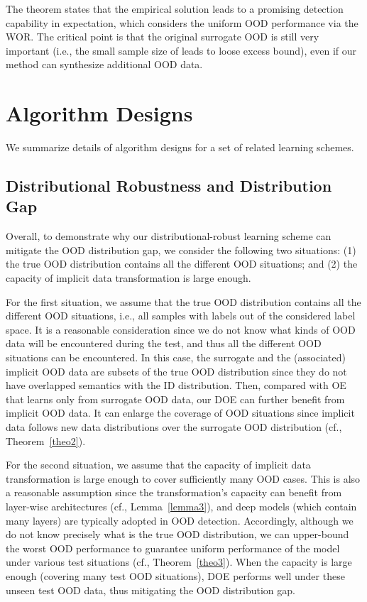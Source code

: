 \documentclass{article} \usepackage{iclr2022_conference,times}
\begin{document}
The theorem states that the empirical solution leads to a promising detection capability in expectation, which considers the uniform OOD performance via the WOR. The critical point is that the original surrogate OOD is still very important (i.e., the small sample size of  leads to loose excess bound), even if our method can synthesize additional OOD data. 

\clearpage
\section{Algorithm Designs}
\label{app: alg}

We summarize details of algorithm designs for a set of related learning schemes. 

\subsection{Distributional Robustness and Distribution Gap}


{
Overall, to demonstrate why our distributional-robust learning scheme can mitigate the OOD distribution gap, we consider the following two situations: (1) the true OOD distribution contains all the different OOD situations; and (2) the capacity of implicit data transformation is large enough.
}

{
For the first situation, we assume that the true OOD distribution contains all the different OOD situations, i.e., all samples with labels out of the considered label space. It is a reasonable consideration since we do not know what kinds of OOD data will be encountered during the test, and thus all the different OOD situations can be encountered. In this case, the surrogate and the (associated) implicit OOD data are subsets of the true OOD distribution since they do not have overlapped semantics with the ID distribution. Then, compared with OE that learns only from surrogate OOD data, our DOE can further benefit from implicit OOD data. It can enlarge the coverage of OOD situations since implicit data follows new data distributions over the surrogate OOD distribution (cf., Theorem~\ref{theo2}).}

{For the second situation, we assume that the capacity of implicit data transformation is large enough to cover sufficiently many OOD cases. This is also a reasonable assumption since the transformation's capacity can benefit from layer-wise architectures (cf., Lemma~\ref{lemma3}), and deep models (which contain many layers) are typically adopted in OOD detection. Accordingly, although we do not know precisely what is the true OOD distribution, we can upper-bound the worst OOD performance to guarantee uniform performance of the model under various test situations (cf., Theorem~\ref{theo3}). When the capacity is large enough (covering many test OOD situations), DOE performs well under these unseen test OOD data, thus mitigating the OOD distribution gap.}
\end{document}
